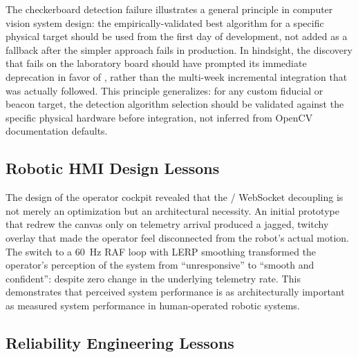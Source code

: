 The checkerboard detection failure illustrates a general principle in computer vision system design: the empirically-validated best algorithm for a specific physical target should be used from the first day of development, not added as a fallback after the simpler approach fails in production. In hindsight, the discovery that  fails on the laboratory board should have prompted its immediate deprecation in favor of , rather than the multi-week incremental integration that was actually followed. This principle generalizes: for any custom fiducial or beacon target, the detection algorithm selection should be validated against the specific physical hardware before integration, not inferred from OpenCV documentation defaults.

\subsection{Robotic HMI Design Lessons}

The design of the operator cockpit revealed that the  / WebSocket decoupling is not merely an optimization but an architectural necessity. An initial prototype that redrew the canvas only on telemetry arrival produced a jagged, twitchy overlay that made the operator feel disconnected from the robot's actual motion. The switch to a 60~Hz RAF loop with LERP smoothing transformed the operator's perception of the system from ``unresponsive'' to ``smooth and confident'': despite zero change in the underlying telemetry rate. This demonstrates that perceived system performance is as architecturally important as measured system performance in human-operated robotic systems.

\subsection{Reliability Engineering Lessons}

